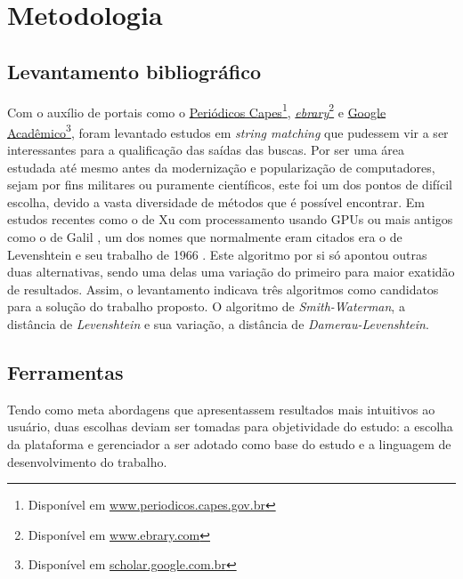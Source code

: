\chapter{\nmu Metodologia} %
\label{cha:metodologia}


\section{Levantamento bibliográfico} %
\label{sec:levantamento_bibliogr_fico}

Com o auxílio de portais como o \href{www.periodicos.capes.gov.br}{Periódicos Capes}\footnote{Disponível em \url{www.periodicos.capes.gov.br}}, \href{www.ebrary.com}{\textit{ebrary}}\footnote{Disponível em \url{www.ebrary.com}} e \href{http://scholar.google.com.br/}{Google Acadêmico}\footnote{Disponível em \url{scholar.google.com.br}}, foram levantado estudos em \textit{string matching} que pudessem vir a ser interessantes para a qualificação das saídas das buscas.  Por ser uma área estudada até mesmo antes da modernização e popularização de computadores, sejam por fins militares ou puramente científicos, este foi um dos pontos de difícil escolha, devido a vasta diversidade de métodos que é possível encontrar. Em estudos recentes como o de Xu \cite{xu2013bit} com processamento usando GPUs ou mais antigos como o de Galil \cite{galil1988data}, um dos nomes que normalmente eram citados era o de Levenshtein e seu trabalho de 1966 \cite{levenshtein1966}. Este algoritmo por si só apontou outras duas alternativas, sendo uma delas uma variação do primeiro para maior exatidão de resultados. Assim, o levantamento indicava três algoritmos como candidatos para a solução do trabalho proposto. O algoritmo de \textit{Smith-Waterman}, a distância de \textit{Levenshtein} e sua variação, a distância de \textit{Damerau-Levenshtein}.



\section{Ferramentas} %
\label{sec:codifica_o}

Tendo como meta abordagens que apresentassem resultados mais intuitivos ao usuário, duas escolhas deviam ser tomadas para objetividade do estudo: a escolha da plataforma e gerenciador a ser adotado como base do estudo e a linguagem de desenvolvimento do trabalho.

